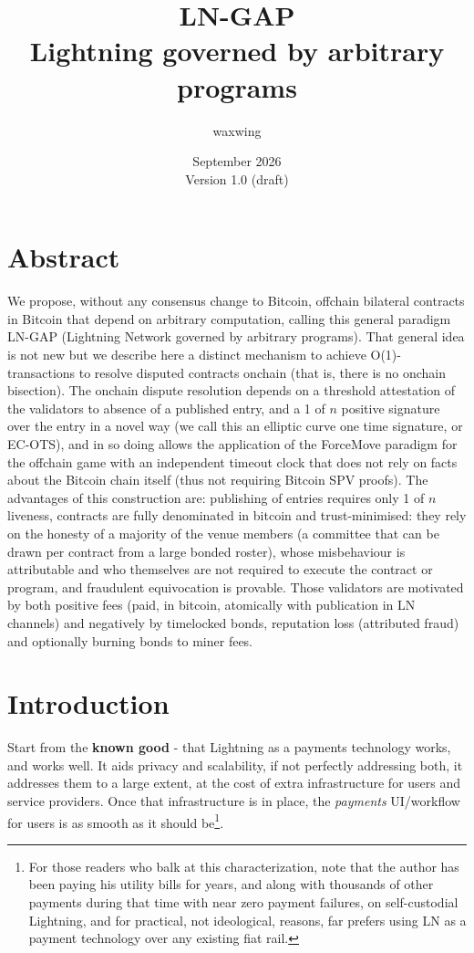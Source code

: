 \documentclass[11pt]{article}
\title{\textbf{LN-GAP}\\Lightning governed by arbitrary programs}
\author{waxwing}
\date{September 2026 \\ \medskip Version 1.0 (draft)}
\begin{document}
\maketitle

\tableofcontents

\section{Abstract}

We propose, without any consensus change to Bitcoin, offchain bilateral contracts in Bitcoin that depend on arbitrary computation, calling this general paradigm LN-GAP (Lightning Network governed by arbitrary programs). That general idea is not new but we describe here a distinct mechanism to achieve O(1)-transactions to resolve disputed contracts onchain (that is, there is no onchain bisection). The onchain dispute resolution depends on a threshold attestation of the validators to absence of a published entry, and a 1 of $n$ positive signature over the entry in a novel way (we call this an elliptic curve one time signature, or EC-OTS), and in so doing allows the application of the ForceMove paradigm for the offchain game with an independent timeout clock that does not rely on facts about the Bitcoin chain itself (thus not requiring Bitcoin SPV proofs). The advantages of this construction are: publishing of entries requires only 1 of $n$ liveness, contracts are fully denominated in bitcoin and trust-minimised: they rely on the honesty of a majority of the venue members (a committee that can be drawn per contract from a large bonded roster), whose misbehaviour is attributable and who themselves are not required to execute the contract or program, and fraudulent equivocation is provable. Those validators are motivated by both positive fees (paid, in bitcoin, atomically with publication in LN channels) and negatively by timelocked bonds, reputation loss (attributed fraud) and optionally burning bonds to miner fees.

\section{Introduction}

Start from the \textbf{known good} - that Lightning as a payments technology works, and works well. It aids privacy and scalability, if not perfectly addressing both, it addresses them to a large extent, at the cost of extra infrastructure for users and service providers. Once that infrastructure is in place, the \emph{payments} UI/workflow for users is as smooth as it should be\footnote{For those readers who balk at this characterization, note that the author has been paying his utility bills for years, and along with thousands of other payments during that time with near zero payment failures, on self-custodial Lightning, and for practical, not ideological, reasons, far prefers using LN as a payment technology over any existing fiat rail.}.
\end{document}
